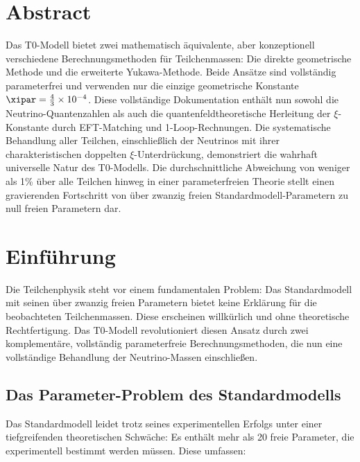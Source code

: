 
	\section*{Abstract}
	Das T0-Modell bietet zwei mathematisch äquivalente, aber konzeptionell verschiedene Berechnungsmethoden für Teilchenmassen: Die direkte geometrische Methode und die erweiterte Yukawa-Methode. Beide Ansätze sind vollständig parameterfrei und verwenden nur die einzige geometrische Konstante $\xipar = \frac{4}{3} \times 10^{-4}$. Diese vollständige Dokumentation enthält nun sowohl die Neutrino-Quantenzahlen als auch die quantenfeldtheoretische Herleitung der $\xi$-Konstante durch EFT-Matching und 1-Loop-Rechnungen. Die systematische Behandlung aller Teilchen, einschließlich der Neutrinos mit ihrer charakteristischen doppelten $\xi$-Unterdrückung, demonstriert die wahrhaft universelle Natur des T0-Modells. Die durchschnittliche Abweichung von weniger als 1\% über alle Teilchen hinweg in einer parameterfreien Theorie stellt einen gravierenden Fortschritt von über zwanzig freien Standardmodell-Parametern zu null freien Parametern dar.
	

	
	\section{Einführung}
	\label{sec:introduction}
	
	Die Teilchenphysik steht vor einem fundamentalen Problem: Das Standardmodell mit seinen über zwanzig freien Parametern bietet keine Erklärung für die beobachteten Teilchenmassen. Diese erscheinen willkürlich und ohne theoretische Rechtfertigung. Das T0-Modell revolutioniert diesen Ansatz durch zwei komplementäre, vollständig parameterfreie Berechnungsmethoden, die nun eine vollständige Behandlung der Neutrino-Massen einschließen.
	
	\subsection{Das Parameter-Problem des Standardmodells}
	\label{subsec:parameter_problem}
	
	Das Standardmodell leidet trotz seines experimentellen Erfolgs unter einer tiefgreifenden theoretischen Schwäche: Es enthält mehr als 20 freie Parameter, die experimentell bestimmt werden müssen. Diese umfassen:
	

